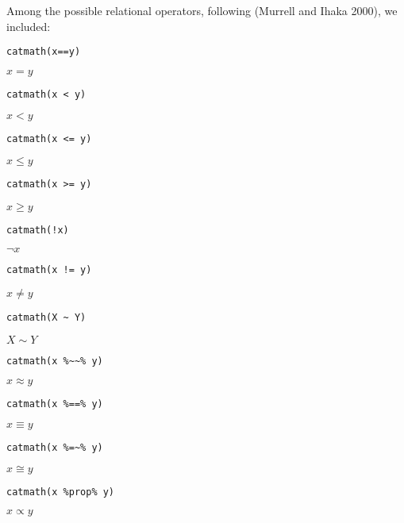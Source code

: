 Among the possible relational operators, following (Murrell and Ihaka 2000), we included:

\begin{verbatim}
catmath(x==y)
\end{verbatim}

\({{x}={y}}\)

\begin{verbatim}
catmath(x < y)
\end{verbatim}

\({{x}<{y}}\)

\begin{verbatim}
catmath(x <= y)
\end{verbatim}

\({{x}\le{y}}\)

\begin{verbatim}
catmath(x >= y)
\end{verbatim}

\({{x}\ge{y}}\)

\begin{verbatim}
catmath(!x)
\end{verbatim}

\({\lnot{x}}\)

\begin{verbatim}
catmath(x != y)
\end{verbatim}

\({{x}\ne{y}}\)

\begin{verbatim}
catmath(X ~ Y)
\end{verbatim}

\({{X}\sim{Y}}\)

\begin{verbatim}
catmath(x %~~% y)
\end{verbatim}

\({{x}\approx{y}}\)

\begin{verbatim}
catmath(x %==% y)
\end{verbatim}

\({{x}\equiv{y}}\)

\begin{verbatim}
catmath(x %=~% y)
\end{verbatim}

\({{x}\cong{y}}\)

\begin{verbatim}
catmath(x %prop% y)
\end{verbatim}

\({{x}\propto{y}}\)

